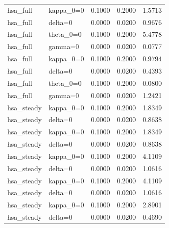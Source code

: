 \begin{tabular}{llrrr}
hsa\_full & kappa\_0=0 & 0.1000 & 0.2000 & 1.5713 \\
hsa\_full & delta=0 & 0.0000 & 0.0200 & 0.9676 \\
hsa\_full & theta\_0=0 & 0.1000 & 0.2000 & 5.4778 \\
hsa\_full & gamma=0 & 0.0000 & 0.0200 & 0.0777 \\
hsa\_full & kappa\_0=0 & 0.1000 & 0.2000 & 0.9794 \\
hsa\_full & delta=0 & 0.0000 & 0.0200 & 0.4393 \\
hsa\_full & theta\_0=0 & 0.1000 & 0.2000 & 0.0800 \\
hsa\_full & gamma=0 & 0.0000 & 0.0200 & 1.2421 \\
hsa\_steady & kappa\_0=0 & 0.1000 & 0.2000 & 1.8349 \\
hsa\_steady & delta=0 & 0.0000 & 0.0200 & 0.8638 \\
hsa\_steady & kappa\_0=0 & 0.1000 & 0.2000 & 1.8349 \\
hsa\_steady & delta=0 & 0.0000 & 0.0200 & 0.8638 \\
hsa\_steady & kappa\_0=0 & 0.1000 & 0.2000 & 4.1109 \\
hsa\_steady & delta=0 & 0.0000 & 0.0200 & 1.0616 \\
hsa\_steady & kappa\_0=0 & 0.1000 & 0.2000 & 4.1109 \\
hsa\_steady & delta=0 & 0.0000 & 0.0200 & 1.0616 \\
hsa\_steady & kappa\_0=0 & 0.1000 & 0.2000 & 2.8901 \\
hsa\_steady & delta=0 & 0.0000 & 0.0200 & 0.4690 \\
\bottomrule
\end{tabular}

